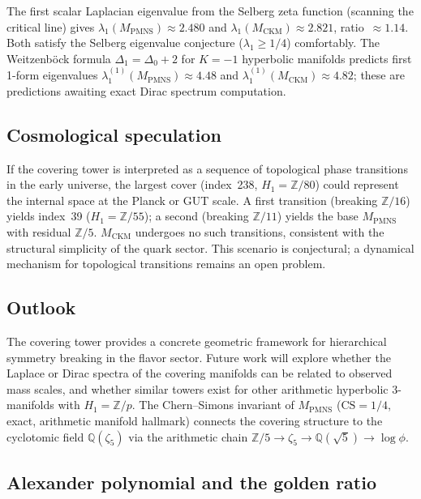 \documentclass[12pt]{article}
\theoremstyle{definition}
\begin{document}
The first scalar Laplacian eigenvalue from the Selberg zeta function
(scanning the critical line) gives $\lambda_1(M_\text{PMNS})\approx 2.480$
and $\lambda_1(M_\text{CKM})\approx 2.821$, ratio~$\approx 1.14$.
Both satisfy the Selberg eigenvalue conjecture ($\lambda_1\geq 1/4$)
comfortably. The Weitzenb\"{o}ck formula $\Delta_1=\Delta_0+2$ for
$K=-1$ hyperbolic manifolds predicts first 1-form eigenvalues
$\lambda_1^{(1)}(M_\text{PMNS})\approx 4.48$ and
$\lambda_1^{(1)}(M_\text{CKM})\approx 4.82$; these are predictions
awaiting exact Dirac spectrum computation.

\subsection{Cosmological speculation}
\label{subsec:cosm_covering}

If the covering tower is interpreted as a sequence of topological
phase transitions in the early universe, the largest cover (index~238,
$H_1=\mathbb{Z}/80$) could represent the internal space at the Planck
or GUT scale. A first transition (breaking $\mathbb{Z}/16$) yields
index~39 ($H_1=\mathbb{Z}/55$); a second (breaking $\mathbb{Z}/11$)
yields the base $M_\text{PMNS}$ with residual $\mathbb{Z}/5$.
$M_\text{CKM}$ undergoes no such transitions, consistent with the
structural simplicity of the quark sector. This scenario is
conjectural; a dynamical mechanism for topological transitions
remains an open problem.

\subsection{Outlook}

The covering tower provides a concrete geometric framework for
hierarchical symmetry breaking in the flavor sector. Future work
will explore whether the Laplace or Dirac spectra of the covering
manifolds can be related to observed mass scales, and whether
similar towers exist for other arithmetic hyperbolic 3-manifolds
with $H_1=\mathbb{Z}/p$. The Chern--Simons invariant of $M_\text{PMNS}$
($\mathrm{CS}=1/4$, exact, arithmetic manifold hallmark) connects
the covering structure to the cyclotomic field
$\mathbb{Q}(\zeta_5)$ via the arithmetic chain
$\mathbb{Z}/5\to\zeta_5\to\mathbb{Q}(\sqrt{5})\to\log\phi$.


\subsection{Alexander polynomial and the golden ratio}
\label{subsec:alexander}
\end{document}
